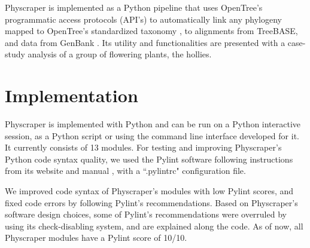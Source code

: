 \documentclass{bmcart}
\begin{document}
Physcraper is implemented as a Python pipeline that uses OpenTree's programmatic access
protocols (API's) to automatically
link any phylogeny mapped to OpenTree's standardized taxonomy \cite{mctavish2015phylesystem},
to alignments
from TreeBASE, and data from GenBank \cite{benson2000genbank}.
Its utility and functionalities are presented with a case-study analysis of a
group of flowering plants, the hollies.


\section*{Implementation}

Physcraper is implemented with Python and can be run on a Python interactive session,
as a Python script or using the command line interface developed for it.
It currently consists of 13 modules.
For testing and improving Physcraper's Python code syntax quality, we
used the Pylint software following instructions from its website \cite{pylintWeb}
 and manual \cite{pylintManual}, with a ``.pylintrc" configuration file.

We improved code syntax of Physcraper's modules with low Pylint scores, and fixed code errors by
following Pylint's recommendations.
Based on Physcraper's software design choices, some of Pylint's recommendations were overruled
by using its check-disabling system, and are explained along the code.
As of now, all Physcraper modules have a Pylint score of 10/10.

\end{document}
